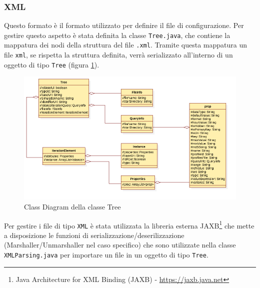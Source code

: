 \documentclass[12pt,a4paper,italian]{article}
\begin{document}
	\subsubsection{XML}\label{xml}
	Questo formato è il formato utilizzato per definire il file di configurazione. Per gestire questo aspetto è stata definita la classe \texttt{Tree.java}, che contiene  la mappatura dei nodi della struttura del file \texttt{.xml}. Tramite questa mappatura un file \texttt{xml}, se rispetta la struttura definita, verrà serializzato all'interno di un oggetto di tipo \texttt{Tree} (figura \ref{treeClass}).\\
	\begin{figure}[h!]
		\centering
		\includegraphics[width=14cm]{img/tree.png}
		\caption{Class Diagram della classe Tree}\label{treeClass}
	\end{figure}
	Per gestire i file di tipo \texttt{XML} è stata utilizzata la libreria esterna JAXB\footnote{Java Architecture for XML Binding (JAXB) - \url{https://jaxb.java.net}} che mette a disposizione le funzioni di serializzazione/deserilizzazione (Marshaller/Unmarshaller nel caso specifico) che sono utilizzate nella classe \texttt{XMLParsing.java} per importare un file in un oggetto di tipo \texttt{Tree}.
	
	\newpage
\end{document}
